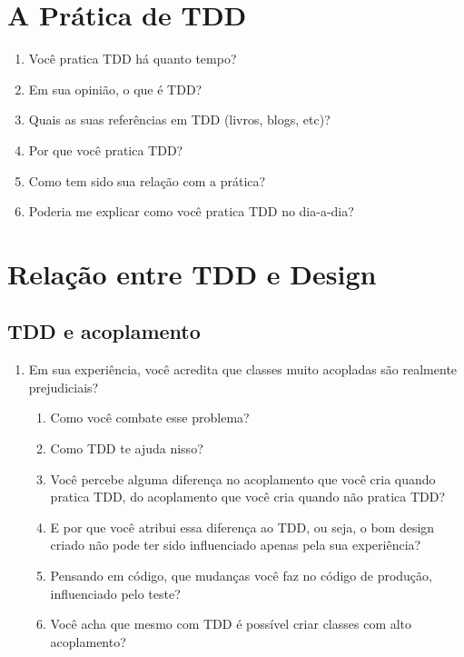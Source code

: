 \section{A Prática de TDD}
\label{entrevista:pratica}

\begin{enumerate}
	\item Você pratica TDD há quanto tempo?

	\item Em sua opinião, o que é TDD?
	
	\item Quais as suas referências em TDD (livros, blogs, etc)?

	\item Por que você pratica TDD?

	\item Como tem sido sua relação com a prática?

	\item Poderia me explicar como você pratica TDD no dia-a-dia?

\end{enumerate}

\section{Relação entre TDD e Design}

\subsection{TDD e acoplamento}
\label{entrevista:acoplamento}

\begin{enumerate}
	\item{Em sua experiência, você acredita que classes muito acopladas são realmente prejudiciais?}
		\begin{enumerate}
			\item Como você combate esse problema?

			\item Como TDD te ajuda nisso?
			
			\item Você percebe alguma diferença no acoplamento que você cria quando
			pratica TDD, do acoplamento que você cria quando não pratica TDD?
			
			\item E por que você atribui essa diferença ao TDD, ou seja, o bom design
			criado não pode ter sido influenciado apenas pela sua experiência?

			\item Pensando em código, que mudanças você faz no código de produção, influenciado
			pelo teste?
			
			\item Você acha que mesmo com TDD é possível criar classes com alto acoplamento? 
		\end{enumerate}
\end{enumerate}

